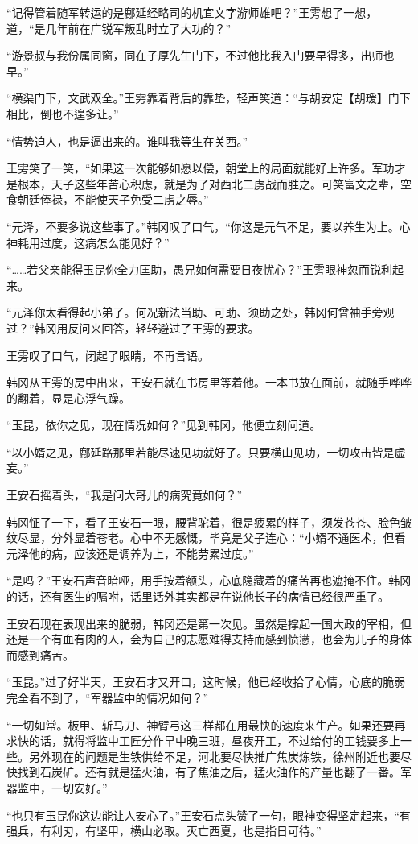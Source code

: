 “记得管着随军转运的是鄜延经略司的机宜文字游师雄吧？”王雱想了一想，道，“是几年前在广锐军叛乱时立了大功的？”

“游景叔与我份属同窗，同在子厚先生门下，不过他比我入门要早得多，出师也早。”

“横渠门下，文武双全。”王雱靠着背后的靠垫，轻声笑道：“与胡安定【胡瑗】门下相比，倒也不遑多让。”

“情势迫人，也是逼出来的。谁叫我等生在关西。”

王雱笑了一笑，“如果这一次能够如愿以偿，朝堂上的局面就能好上许多。军功才是根本，天子这些年苦心积虑，就是为了对西北二虏战而胜之。可笑富文之辈，空食朝廷俸禄，不能使天子免受二虏之辱。”

“元泽，不要多说这些事了。”韩冈叹了口气，“你这是元气不足，要以养生为上。心神耗用过度，这病怎么能见好？”

“……若父亲能得玉昆你全力匡助，愚兄如何需要日夜忧心？”王雱眼神忽而锐利起来。

“元泽你太看得起小弟了。何况新法当助、可助、须助之处，韩冈何曾袖手旁观过？”韩冈用反问来回答，轻轻避过了王雱的要求。

王雱叹了口气，闭起了眼睛，不再言语。

韩冈从王雱的房中出来，王安石就在书房里等着他。一本书放在面前，就随手哗哗的翻着，显是心浮气躁。

“玉昆，依你之见，现在情况如何？”见到韩冈，他便立刻问道。

“以小婿之见，鄜延路那里若能尽速见功就好了。只要横山见功，一切攻击皆是虚妄。”

王安石摇着头，“我是问大哥儿的病究竟如何？”

韩冈怔了一下，看了王安石一眼，腰背驼着，很是疲累的样子，须发苍苍、脸色皱纹尽显，分外显着苍老。心中不无感慨，毕竟是父子连心：“小婿不通医术，但看元泽他的病，应该还是调养为上，不能劳累过度。”

“是吗？”王安石声音暗哑，用手按着额头，心底隐藏着的痛苦再也遮掩不住。韩冈的话，还有医生的嘱咐，话里话外其实都是在说他长子的病情已经很严重了。

王安石现在表现出来的脆弱，韩冈还是第一次见。虽然是撑起一国大政的宰相，但还是一个有血有肉的人，会为自己的志愿难得支持而感到愤懑，也会为儿子的身体而感到痛苦。

“玉昆。”过了好半天，王安石才又开口，这时候，他已经收拾了心情，心底的脆弱完全看不到了，“军器监中的情况如何？”

“一切如常。板甲、斩马刀、神臂弓这三样都在用最快的速度来生产。如果还要再求快的话，就得将监中工匠分作早中晚三班，昼夜开工，不过给付的工钱要多上一些。另外现在的问题是生铁供给不足，河北要尽快推广焦炭炼铁，徐州附近也要尽快找到石炭矿。还有就是猛火油，有了焦油之后，猛火油作的产量也翻了一番。军器监中，一切安好。”

“也只有玉昆你这边能让人安心了。”王安石点头赞了一句，眼神变得坚定起来，“有强兵，有利刃，有坚甲，横山必取。灭亡西夏，也是指日可待。”

